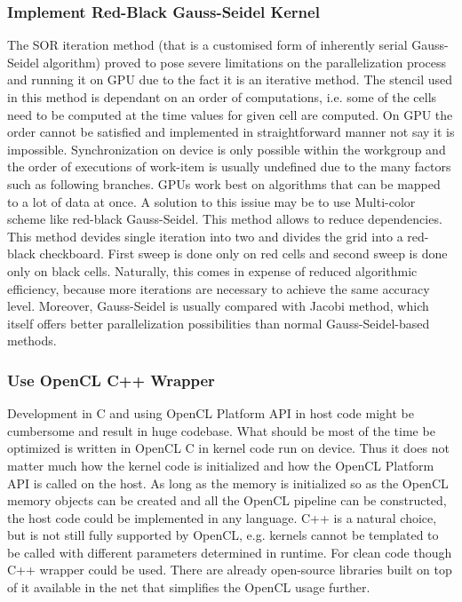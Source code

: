 \subsubsection{Implement Red-Black Gauss-Seidel Kernel}
The SOR iteration method (that is a customised form of inherently serial Gauss-Seidel algorithm) proved to pose severe limitations on the parallelization process and running it on GPU due to the fact it is an iterative method. The stencil used in this method is dependant on an order of computations, i.e. some of the cells need to be computed at the time values for given cell are computed. On GPU the order cannot be satisfied and implemented in straightforward manner not say it is impossible. Synchronization on device is only possible within the workgroup and the order of executions of work-item is usually undefined due to the many factors such as following branches. GPUs work best on algorithms that can be mapped to a lot of data at once. A solution to this issiue may be to use Multi-color scheme like red-black Gauss-Seidel. This method allows to reduce dependencies. This method devides single iteration into two and divides the grid into a red-black checkboard. First sweep is done only on red cells and second sweep is done only on black cells. Naturally, this comes in expense of reduced algorithmic efficiency, because more iterations are necessary to achieve the same accuracy level. Moreover, Gauss-Seidel is usually compared with Jacobi method, which itself offers better parallelization possibilities than normal Gauss-Seidel-based methods.

\subsubsection{Use OpenCL C++ Wrapper}
Development in C and using OpenCL Platform API in host code might be cumbersome and result in huge codebase. What should be most of the time be optimized is written in OpenCL C in kernel code run on device. Thus it does not matter much how the kernel code is initialized and how the OpenCL Platform API is called on the host. As long as the memory is initialized so as the OpenCL memory objects can be created and all the OpenCL pipeline can be constructed, the host code could be implemented in any language. C++ is a natural choice, but is not still fully supported by OpenCL, e.g. kernels cannot be templated to be called with different parameters determined in runtime. For clean code though C++ wrapper could be used. There are already open-source libraries built on top of it available in the net that simplifies the OpenCL usage further.

